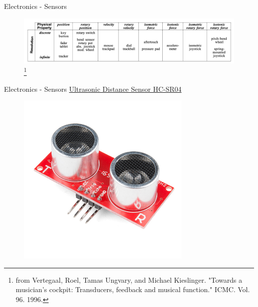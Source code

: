 \documentclass{beamer}
\newcommand\blfootnote[1]{%
  \begingroup
  \renewcommand\thefootnote{}\footnote{#1}%
  \addtocounter{footnote}{-1}%
  \endgroup
}
\begin{document}
\begin{frame}{Electronics - Sensors}
    \begin{figure}[h]
        \includegraphics[width=\textwidth]{vertegaal.png}\blfootnote{from Vertegaal, Roel, Tamas Ungvary, and Michael Kieslinger. "Towards a musician's cockpit: Transducers, feedback and musical function." ICMC. Vol. 96. 1996.}
    \end{figure}
\end{frame}

\begin{frame}{Electronics - Sensors}
    \href{https://www.sparkfun.com/products/13959}{Ultrasonic Distance Sensor HC-SR04}
    \begin{figure}[h]
        \includegraphics[width=0.75\textwidth]{ultrasonic.jpg}
    \end{figure}
\end{frame}
\end{document}
